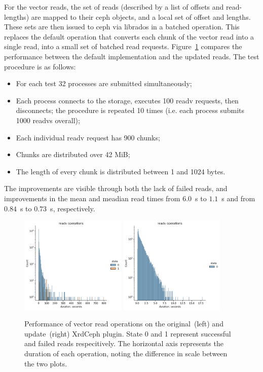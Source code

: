 \documentclass{webofc}
\begin{document}
For the vector reads, the set of reads (described by a list of offsets and read-lengths) are mapped to their ceph objects, and a local set of offset and lengths. These sets are then issued to ceph via librados in a batched operation. This replaces the default operation that converts each chunk of the vector read into a single read, into a small set of batched read requests.
Figure~\ref{fig:readv} compares the performance between the default implementation and the updated reads. The test procedure is as follows: 
\begin{itemize}
     \item For each test 32 processes are submitted simultaneously;
     \item Each process connects to the storage, executes 100 readv requests, then disconnects; the procedure is repeated 10 times (i.e. each process submits 1000 readvs overall);
     \item Each individual readv request has 900 chunks;
     \item Chunks are distributed over 42 MiB;
     \item The length of every chunk is distributed between 1 and 1024 bytes.
\end{itemize}
The improvements are visible through both the lack of failed reads, and improvements in the mean and meadian read times from $6.0$~s to $1.1$~s and from $0.84$~s to $0.73$~s, respectively. 
%
\begin{figure}[h]
     \centering
     \includegraphics[width=0.45\textwidth,clip]{figures/readv_original.png}\hfil
     \includegraphics[width=0.45\textwidth,clip]{figures/readv_patched.png}
     \caption{Performance of vector read operations on the original~(left) and update~(right) XrdCeph plugin. State 0 and 1 represent successful and failed reads respecitively. The horizontal axis represents the duration of each operation, noting the difference in scale between the two plots.}
     \label{fig:readv}       %
\end{figure}
\end{document}
